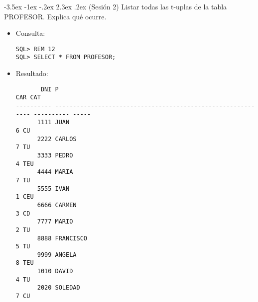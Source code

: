 \documentclass[11pt]{report}
\makeatletter
\renewcommand\chapter{\@startsection{chapter}{0}{\z@}%
    {-3.5ex \@plus -1ex \@minus -.2ex}%
    {2.3ex \@plus.2ex}%
    {\normalfont\Large\bfseries}}
\makeatother
\begin{document}
\chapter{(Sesión 2) Listar todas las t-uplas de la tabla PROFESOR. Explica qué ocurre.}
\begin{itemize}
  \item Consulta:
  \begin{verbatim}
SQL> REM 12
SQL> SELECT * FROM PROFESOR;
  \end{verbatim}
  \item{Resultado:}
  \begin{verbatim}
       DNI P                                                                   CAR CAT                                                                                                                  
---------- ------------------------------------------------------------ ---------- -----                                                                                                                
      1111 JUAN                                                                  6 CU                                                                                                                   
      2222 CARLOS                                                                7 TU                                                                                                                   
      3333 PEDRO                                                                 4 TEU                                                                                                                  
      4444 MARIA                                                                 7 TU                                                                                                                   
      5555 IVAN                                                                  1 CEU                                                                                                                  
      6666 CARMEN                                                                3 CD                                                                                                                   
      7777 MARIO                                                                 2 TU                                                                                                                   
      8888 FRANCISCO                                                             5 TU                                                                                                                   
      9999 ANGELA                                                                8 TEU                                                                                                                  
      1010 DAVID                                                                 4 TU                                                                                                                   
      2020 SOLEDAD                                                               7 CU                                                                                                                   


\end{verbatim}
\end{itemize}
\end{document}
